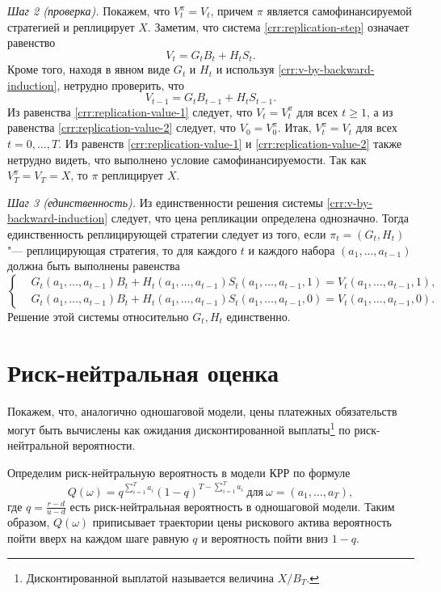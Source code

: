 \textit{Шаг 2 (проверка).} Покажем, что $V_t^\pi = V_t$, причем $\pi$ является самофинансируемой стратегией и реплицирует $X$.
Заметим, что система \eqref{crr:replication-step} означает равенство
\begin{equation}
\label{crr:replication-value-1}
V_t = G_tB_t + H_t S_t.
\end{equation}
Кроме того, находя в явном виде $G_t$ и $H_t$ и используя \eqref{crr:v-by-backward-induction}, нетрудно проверить, что 
\begin{equation}
\label{crr:replication-value-2}
V_{t-1} = G_tB_{t-1} + H_t S_{t-1}.
\end{equation}
Из равенства \eqref{crr:replication-value-1} следует, что $V_t = V_t^\pi$ для всех $t\ge 1$, а из равенства \eqref{crr:replication-value-2} следует, что $V_0 = V_0^\pi$.
Итак, $V_t^\pi = V_t$ для всех $t=0,\dots,T$.
Из равенств \eqref{crr:replication-value-1} и \eqref{crr:replication-value-2} также нетрудно видеть, что выполнено условие самофинансируемости.
Так как $V_T^\pi = V_T=X$, то $\pi$ реплицирует $X$.

\textit{Шаг 3 (единственность).} Из единственности решения системы \eqref{crr:v-by-backward-induction} следует, что цена репликации определена однозначно.
Тогда единственность реплицирующей стратегии следует из того, если $\pi_t=(G_t,H_t)$ "--- реплицирующая стратегия, то для каждого $t$ и каждого набора $(a_1,\dots,a_{t-1})$ должна быть выполнены равенства
\[
\left\{
\begin{aligned}
&G_t(a_1,\dots,a_{t-1}) B_t + H_t(a_1,\dots,a_{t-1}) S_t(a_1,\ldots,a_{t-1}, 1) = V_{t}(a_1,\ldots,a_{t-1}, 1),\\
&G_t(a_1,\dots,a_{t-1}) B_t + H_t(a_1,\dots,a_{t-1}) S_t(a_1,\ldots,a_{t-1}, 0) = V_{t}(a_1,\ldots,a_{t-1}, 0).
\end{aligned}
\right.
\]
Решение этой системы относительно $G_t,H_t$ единственно.


\section{Риск-нейтральная оценка}

Покажем, что, аналогично одношаговой модели, цены платежных обязательств могут быть вычислены как ожидания дисконтированной выплаты\footnote{Дисконтированной выплатой называется величина $X/B_T$.} по риск-ней\-траль\-ной вероятности. 

Определим риск-нейтральную вероятность в модели КРР по формуле
\[
Q(\omega) = q^{\sum_{i=1}^T a_i} (1-q)^{T-\sum_{i=1}^T a_i}\ \text{для}\ \omega = (a_1,\dots,a_T),
\]
где $q = \frac{r-d}{u-d}$ есть риск-нейтральная вероятность в одношаговой модели.
Таким образом, $Q(\omega)$ приписывает траектории цены рискового актива вероятность пойти вверх на каждом шаге равную $q$ и вероятность пойти вниз $1-q$. 

